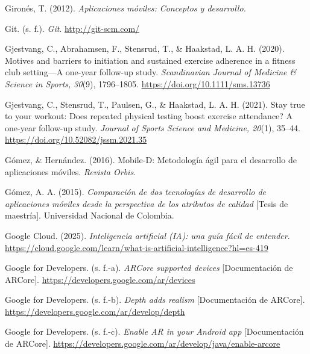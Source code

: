 \begin{referenciasapa}
\item Gironés, T. (2012). \textit{Aplicaciones móviles: Conceptos y desarrollo.}

\item Git. (s. f.). \textit{Git}. \url{http://git-scm.com/}

\item Gjestvang, C., Abrahamsen, F., Stensrud, T., \& Haakstad, L. A. H. (2020). Motives and barriers to initiation and sustained exercise adherence in a fitness club setting---A one-year follow-up study. \textit{Scandinavian Journal of Medicine \& Science in Sports, 30}(9), 1796--1805. \url{https://doi.org/10.1111/sms.13736}

\item Gjestvang, C., Stensrud, T., Paulsen, G., \& Haakstad, L. A. H. (2021). Stay true to your workout: Does repeated physical testing boost exercise attendance? A one-year follow-up study. \textit{Journal of Sports Science and Medicine, 20}(1), 35--44. \url{https://doi.org/10.52082/jssm.2021.35}

\item Gómez, \& Hernández. (2016). Mobile-D: Metodología ágil para el desarrollo de aplicaciones móviles. \textit{Revista Orbis}.

\item Gómez, A. A. (2015). \textit{Comparación de dos tecnologías de desarrollo de aplicaciones móviles desde la perspectiva de los atributos de calidad} [Tesis de maestría]. Universidad Nacional de Colombia.

\item Google Cloud. (2025). \textit{Inteligencia artificial (IA): una guía fácil de entender}. \url{https://cloud.google.com/learn/what-is-artificial-intelligence?hl=es-419}

\item Google for Developers. (s. f.-a). \textit{ARCore supported devices} [Documentación de ARCore]. \url{https://developers.google.com/ar/devices}

\item Google for Developers. (s. f.-b). \textit{Depth adds realism} [Documentación de ARCore]. \url{https://developers.google.com/ar/develop/depth}

\item Google for Developers. (s. f.-c). \textit{Enable AR in your Android app} [Documentación de ARCore]. \url{https://developers.google.com/ar/develop/java/enable-arcore}


\end{referenciasapa}
